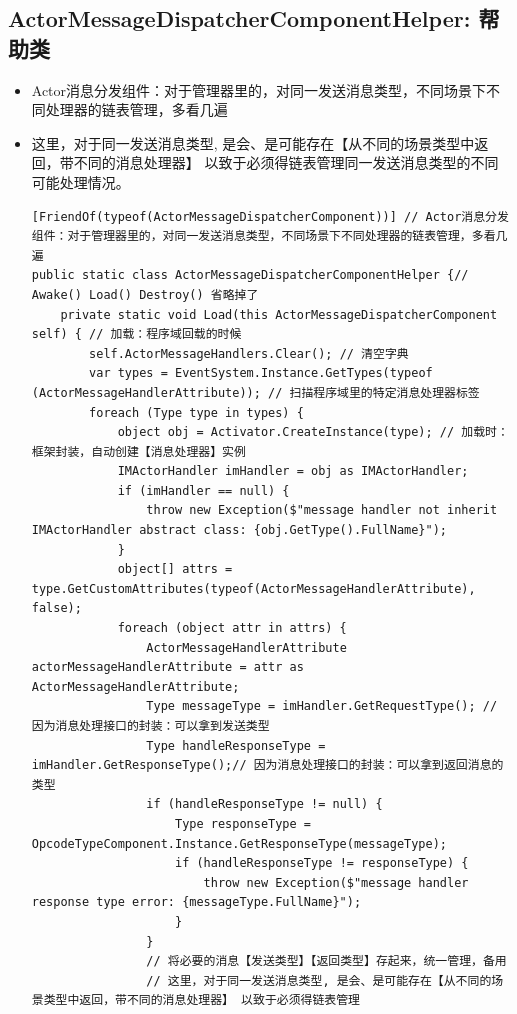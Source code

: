\documentclass[9pt, b5paper]{article}
\begin{document}
\subsection{ActorMessageDispatcherComponentHelper: 帮助类}
\label{sec-2-14}
\begin{itemize}
\item Actor消息分发组件：对于管理器里的，对同一发送消息类型，不同场景下不同处理器的链表管理，多看几遍
\item 这里，对于同一发送消息类型, 是会、是可能存在【从不同的场景类型中返回，带不同的消息处理器】 以致于必须得链表管理同一发送消息类型的不同可能处理情况。
\begin{verbatim}
[FriendOf(typeof(ActorMessageDispatcherComponent))] // Actor消息分发组件：对于管理器里的，对同一发送消息类型，不同场景下不同处理器的链表管理，多看几遍
public static class ActorMessageDispatcherComponentHelper {// Awake() Load() Destroy() 省略掉了
    private static void Load(this ActorMessageDispatcherComponent self) { // 加载：程序域回载的时候
        self.ActorMessageHandlers.Clear(); // 清空字典 
        var types = EventSystem.Instance.GetTypes(typeof (ActorMessageHandlerAttribute)); // 扫描程序域里的特定消息处理器标签 
        foreach (Type type in types) {
            object obj = Activator.CreateInstance(type); // 加载时：框架封装，自动创建【消息处理器】实例
            IMActorHandler imHandler = obj as IMActorHandler;
            if (imHandler == null) {
                throw new Exception($"message handler not inherit IMActorHandler abstract class: {obj.GetType().FullName}");
            }
            object[] attrs = type.GetCustomAttributes(typeof(ActorMessageHandlerAttribute), false);
            foreach (object attr in attrs) {
                ActorMessageHandlerAttribute actorMessageHandlerAttribute = attr as ActorMessageHandlerAttribute;
                Type messageType = imHandler.GetRequestType(); // 因为消息处理接口的封装：可以拿到发送类型
                Type handleResponseType = imHandler.GetResponseType();// 因为消息处理接口的封装：可以拿到返回消息的类型
                if (handleResponseType != null) {
                    Type responseType = OpcodeTypeComponent.Instance.GetResponseType(messageType);
                    if (handleResponseType != responseType) {
                        throw new Exception($"message handler response type error: {messageType.FullName}");
                    }
                }
                // 将必要的消息【发送类型】【返回类型】存起来，统一管理，备用
                // 这里，对于同一发送消息类型, 是会、是可能存在【从不同的场景类型中返回，带不同的消息处理器】 以致于必须得链表管理

\end{verbatim}
\end{itemize}
\end{document}

